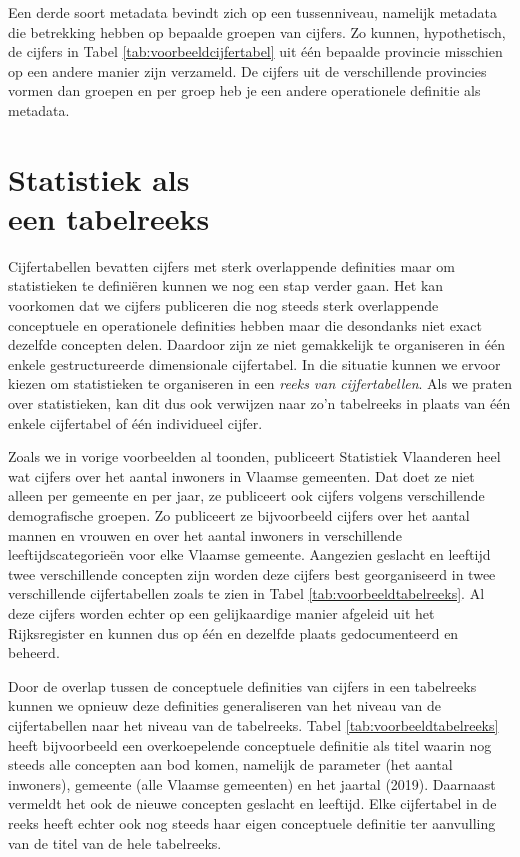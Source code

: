 \documentclass[\mainfiledir/00_handleiding_statistiekproductie.tex]{subfiles}
\begin{document}
Een derde soort metadata bevindt zich op een tussenniveau, namelijk metadata die betrekking hebben op bepaalde groepen van cijfers. Zo kunnen, hypothetisch, de cijfers in Tabel \ref{tab:voorbeeldcijfertabel} uit één bepaalde provincie misschien op een andere manier zijn verzameld. De cijfers uit de verschillende provincies vormen dan groepen en per groep heb je een andere operationele definitie als metadata.   
		












	
\section[Statistiek als een tabelreeks]{Statistiek als\\een tabelreeks}
	
Cijfertabellen bevatten cijfers met sterk overlappende definities maar om statistieken te definiëren kunnen we nog een stap verder gaan. Het kan voorkomen dat we cijfers publiceren die nog steeds sterk overlappende conceptuele en operationele definities hebben maar die desondanks niet exact dezelfde concepten delen. Daardoor zijn ze niet gemakkelijk te organiseren in één enkele gestructureerde dimensionale cijfertabel. In die situatie kunnen we ervoor kiezen om statistieken te organiseren in een \emph{reeks van cijfertabellen}. Als we praten over statistieken, kan dit dus ook verwijzen naar zo'n tabelreeks in plaats van één enkele cijfertabel of één individueel cijfer.   

Zoals we in vorige voorbeelden al toonden, publiceert Statistiek Vlaanderen heel wat cijfers over het aantal inwoners in Vlaamse gemeenten. Dat doet ze niet alleen per gemeente en per jaar, ze publiceert ook cijfers volgens verschillende demografische groepen. Zo publiceert ze bijvoorbeeld cijfers over het aantal mannen en vrouwen en over het aantal inwoners in verschillende leeftijdscategorieën voor elke Vlaamse gemeente. Aangezien geslacht en leeftijd twee verschillende concepten zijn worden deze cijfers best georganiseerd in twee verschillende cijfertabellen zoals te zien in Tabel \ref{tab:voorbeeldtabelreeks}. Al deze cijfers worden echter op een gelijkaardige manier afgeleid uit het Rijksregister en kunnen dus op één en dezelfde plaats gedocumenteerd en beheerd.

Door de overlap tussen de conceptuele definities van cijfers in een tabelreeks kunnen we opnieuw deze definities generaliseren van het niveau van de cijfertabellen naar het niveau van de tabelreeks. Tabel \ref{tab:voorbeeldtabelreeks} heeft bijvoorbeeld een overkoepelende conceptuele definitie als titel waarin nog steeds alle concepten aan bod komen, namelijk de parameter (het aantal inwoners),  gemeente (alle Vlaamse gemeenten) en het jaartal (2019). Daarnaast vermeldt het ook de nieuwe concepten geslacht en leeftijd. Elke cijfertabel in de reeks heeft echter ook nog steeds haar eigen conceptuele definitie ter aanvulling van de titel van de hele tabelreeks. 
\end{document}
